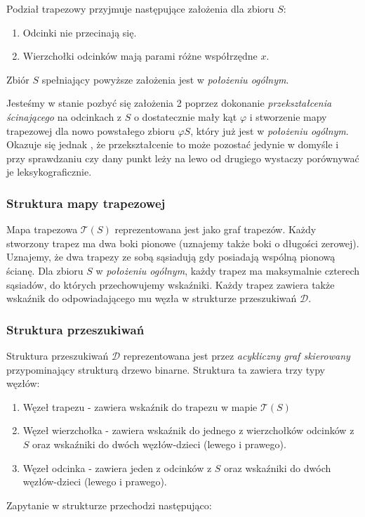 \documentclass[11pt,a4paper]{article}
\begin{document}
Podział trapezowy przyjmuje następujące założenia dla
zbioru $S$:
\begin{enumerate}
    \item Odcinki nie przecinają się.
    \item Wierzchołki odcinków mają parami różne współrzędne $x$.
\end{enumerate}

Zbiór $S$ spełniający powyższe założenia jest w \textit{położeniu ogólnym}.

Jesteśmy w stanie pozbyć się założenia 2 poprzez dokonanie
\textit{przekształcenia ścinającego} na odcinkach z $S$
o dostatecznie mały kąt $\varphi$ i stworzenie mapy trapezowej
dla nowo powstałego zbioru $\varphi S$, który już jest 
w \textit{położeniu ogólnym}.
Okazuje się jednak \cite[s. 137-139]{compgeo},
że przekształcenie to może pozostać jedynie w domyśle i
przy sprawdzaniu czy dany punkt leży na lewo od drugiego
wystaczy porównywać je leksykograficznie.

\subsubsection{Struktura mapy trapezowej}
Mapa trapezowa $\mathscr{T}(S)$ reprezentowana 
jest jako graf trapezów. Każdy stworzony trapez 
ma dwa boki pionowe (uznajemy także boki o długości zerowej).
Uznajemy, że dwa trapezy ze sobą sąsiadują gdy 
posiadają wspólną pionową ścianę. Dla zbioru
$S$ w \textit{położeniu ogólnym}, każdy trapez
ma maksymalnie czterech sąsiadów, do których
przechowujemy wskaźniki. Każdy trapez zawiera
także wskaźnik do odpowiadającego mu węzła
w strukturze przeszukiwań $\mathscr{D}$.

\subsubsection{Struktura przeszukiwań}
Struktura przeszukiwań $\mathscr{D}$ reprezentowana
jest przez \textit{acykliczny graf skierowany} 
przypominający strukturą drzewo binarne. Struktura
ta zawiera trzy typy węzłów:
\begin{enumerate}
    \item Węzeł trapezu
    - zawiera wskaźnik do trapezu w mapie $\mathscr{T}(S)$
    \item Węzeł wierzchołka
    - zawiera wskaźnik do jednego z wierzchołków odcinków z $S$
    oraz wskaźniki do dwóch węzłów-dzieci (lewego i prawego).
    \item Węzeł odcinka
    - zawiera jeden z odcinków z $S$
    oraz wskaźniki do dwóch węzłów-dzieci (lewego i prawego).
\end{enumerate}
Zapytanie w strukturze przechodzi następująco:
\end{document}
